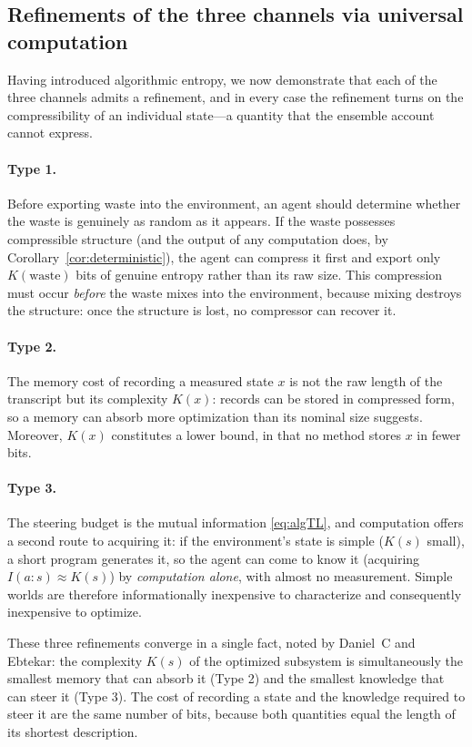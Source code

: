 \documentclass[10pt]{article}
\theoremstyle{definition}
\theoremstyle{remark}
\begin{document}
\subsection{Refinements of the three channels via universal computation}
\label{sec:typesharpen}

Having introduced algorithmic entropy, we now demonstrate that each of the three channels admits a refinement, and in every case the refinement turns on the compressibility of an individual state---a quantity that the ensemble account cannot express.

\paragraph{Type 1.} Before exporting waste into the environment, an agent should determine whether the waste is genuinely as random as it appears. If the waste possesses compressible structure (and the output of any computation does, by Corollary~\ref{cor:deterministic}), the agent can compress it first and export only $K(\text{waste})$ bits of genuine entropy rather than its raw size. This compression must occur \emph{before} the waste mixes into the environment, because mixing destroys the structure: once the structure is lost, no compressor can recover it.

\paragraph{Type 2.} The memory cost of recording a measured state $x$ is not the raw length of the transcript but its complexity $K(x)$: records can be stored in compressed form, so a memory can absorb more optimization than its nominal size suggests. Moreover, $K(x)$ constitutes a lower bound, in that no method stores $x$ in fewer bits.

\paragraph{Type 3.} The steering budget is the mutual information \eqref{eq:algTL}, and computation offers a second route to acquiring it: if the environment's state is simple ($K(s)$ small), a short program generates it, so the agent can come to know it (acquiring $I(a:s) \approx K(s)$) by \emph{computation alone}, with almost no measurement. Simple worlds are therefore informationally inexpensive to characterize and consequently inexpensive to optimize.

These three refinements converge in a single fact, noted by Daniel~C and Ebtekar: the complexity $K(s)$ of the optimized subsystem is simultaneously the smallest memory that can absorb it (Type 2) and the smallest knowledge that can steer it (Type 3). The cost of recording a state and the knowledge required to steer it are the same number of bits, because both quantities equal the length of its shortest description.
\end{document}
